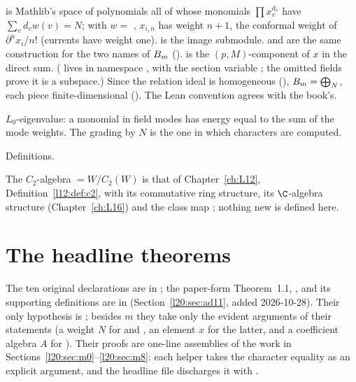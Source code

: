 \begin{dictionary}
 is Mathlib's space of polynomials all of whose monomials
$\prod x_v^{d_v}$ have $\sum_vd_vw(v)=N$; with $w=$ , $x_{i,n}$ has weight $n+1$, the
conformal weight of $\partial^nx_i/n!$ (currents have weight one).  is the image submodule.
 and  are the same construction for the two names of $B_m$
().  is the $(p,M)$-component of $x$ in the
direct sum. ( lives in namespace , with the section
variable ; the omitted fields prove it is a subspace.) Since the relation ideal is homogeneous
(), $B_m=\bigoplus_N$, each piece
finite-dimensional (). The Lean convention agrees with the book's.
\end{dictionary}

\begin{physics}
$L_0$-eigenvalue: a monomial in field modes has energy equal to the sum of the mode weights. The grading
by $N$ is the one in which characters are computed.
\end{physics}

\begin{status}
Definitions.
\end{status}

The $C_2$-algebra  $=W/C_2(W)$ is that of Chapter~\ref{ch:L12}, Definition~\ref{l12:def:c2}, with its
commutative ring structure, its $\C$-algebra structure (Chapter~\ref{ch:L16}) and the class map
; nothing new is defined here.

\section{The headline theorems}\label{l20:sec:headlines}

The ten original declarations are in ;
the paper-form Theorem~1.1, , and its supporting definitions are in
 (Section~\ref{l20:sec:ad11}, added 2026-10-28).
Their only hypothesis is ; besides $m$ they take only the evident arguments of their statements (a weight
$N$ for  and , an element $x$ for the latter, and a
coefficient algebra $A$ for ). Their proofs are
one-line assemblies of the work in Sections~\ref{l20:sec:m0}--\ref{l20:sec:m8}: each 
helper takes the character equality as an explicit argument, and the headline file discharges it with
.

